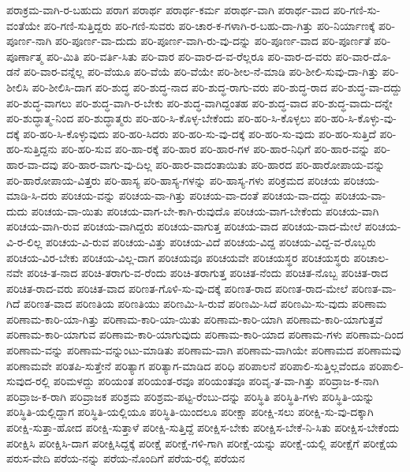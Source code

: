 {ಪರಾಕ್ರಮ-ವಾಗಿ-ರ-ಬಹುದು
ಪರಾಗ
ಪರಾರ್ಥ
ಪರಾರ್ಥ-ಕರ್ಮ
ಪರಾರ್ಥ-ವಾಗಿ
ಪರಾರ್ಥ-ವಾದ
ಪರಿ-ಗಣಿ-ಸು-ವಂತೆಯೇ
ಪರಿ-ಗಣಿ-ಸುತ್ತಿದ್ದರು
ಪರಿ-ಗಣಿ-ಸುವರು
ಪರಿ-ಚಾರ-ಕ-ಗಳಾಗಿ-ರ-ಬಹು-ದಾ-ಗಿತ್ತು
ಪರಿ-ನಿರ್ಯಾಣಕ್ಕೆ
ಪರಿ-ಪೂರ್ಣ-ನಾಗಿ
ಪರಿ-ಪೂರ್ಣ-ವಾ-ದುದು
ಪರಿ-ಪೂರ್ಣ-ವಾಗಿ-ರು-ವು-ದನ್ನು
ಪರಿ-ಪೂರ್ಣ-ವಾದ
ಪರಿ-ಪೂರ್ಣತೆ
ಪರಿ-ಪೂರ್ಣಾತ್ಮ
ಪರಿ-ಮಿತಿ
ಪರಿ-ವರ್ತಿ-ಸಿತು
ಪರಿ-ವಾರ
ಪರಿ-ವಾರ-ದ-ವ-ರೆಲ್ಲರೂ
ಪರಿ-ವಾರ-ದ-ವರು
ಪರಿ-ವಾರ-ದೊ-ಡನೆ
ಪರಿ-ವಾರ-ವನ್ನೆಲ್ಲ
ಪರಿ-ವೆಯೂ
ಪರಿ-ವೆಯೆ
ಪರಿ-ವೆಯೇ
ಪರಿ-ಶೀಲ-ನೆ-ಮಾಡಿ
ಪರಿ-ಶೀಲಿ-ಸುವು-ದಾ-ಗಿತ್ತು
ಪರಿ-ಶೀಲಿಸಿ
ಪರಿ-ಶೀಲಿಸಿ-ದಾಗ
ಪರಿ-ಶುದ್ಧ
ಪರಿ-ಶುದ್ಧ-ನಾದ
ಪರಿ-ಶುದ್ಧ-ರಾಗು-ವರು
ಪರಿ-ಶುದ್ಧ-ರಾದ
ಪರಿ-ಶುದ್ಧ-ವಾ-ದದ್ದು
ಪರಿ-ಶುದ್ಧ-ವಾಗಲು
ಪರಿ-ಶುದ್ಧ-ವಾಗಿ-ರ-ಬೇಕು
ಪರಿ-ಶುದ್ಧ-ವಾಗಿದ್ದಂತಹ
ಪರಿ-ಶುದ್ಧ-ವಾದ
ಪರಿ-ಶುದ್ಧ-ವಾದು-ದನ್ನೇ
ಪರಿ-ಶುದ್ಧಾತ್ಮ-ನಿಂದ
ಪರಿ-ಶುದ್ಧಾತ್ಮರು
ಪರಿ-ಹರಿ-ಸಿ-ಕೊಳ್ಳ-ಬೇಕೆಂದು
ಪರಿ-ಹರಿ-ಸಿ-ಕೊಳ್ಳಲು
ಪರಿ-ಹರಿ-ಸಿ-ಕೊಳ್ಳು-ವು-ದಕ್ಕೆ
ಪರಿ-ಹರಿ-ಸಿ-ಕೊಳ್ಳುವುದು
ಪರಿ-ಹರಿ-ಸಿದರು
ಪರಿ-ಹರಿ-ಸು-ವು-ದಕ್ಕೆ
ಪರಿ-ಹರಿ-ಸು-ವುದು
ಪರಿ-ಹರಿ-ಸುತ್ತಿದೆ
ಪರಿ-ಹರಿ-ಸುತ್ತಿದ್ದನು
ಪರಿ-ಹರಿ-ಸುವ
ಪರಿ-ಹಾ-ರಕ್ಕೆ
ಪರಿ-ಹಾರ
ಪರಿ-ಹಾರ-ಗಳ
ಪರಿ-ಹಾರ-ನಿಧಿಗೆ
ಪರಿ-ಹಾರ-ವನ್ನು
ಪರಿ-ಹಾರ-ವಾ-ದವು
ಪರಿ-ಹಾರ-ವಾಗು-ವು-ದಿಲ್ಲ
ಪರಿ-ಹಾರ-ವಾದಂತಾಯಿತು
ಪರಿ-ಹಾರದ
ಪರಿ-ಹಾರೋಪಾಯ-ವನ್ನು
ಪರಿ-ಹಾರೋಪಾಯ-ವಿತ್ತರು
ಪರಿ-ಹಾಸ್ಯ
ಪರಿ-ಹಾಸ್ಯ-ಗಳನ್ನು
ಪರಿ-ಹಾಸ್ಯ-ಗಳು
ಪರಿಕ್ರಮದ
ಪರಿಚಯ
ಪರಿಚಯ-ಮಾಡಿ-ಸಿ-ದರು
ಪರಿಚಯ-ವನ್ನು
ಪರಿಚಯ-ವಾ-ಗಿತ್ತು
ಪರಿಚಯ-ವಾ-ದಂತೆ
ಪರಿಚಯ-ವಾ-ದದ್ದು
ಪರಿಚಯ-ವಾ-ದುದು
ಪರಿಚಯ-ವಾ-ಯಿತು
ಪರಿಚಯ-ವಾಗ-ಬೇ-ಕಾಗಿ-ರುವುದೊ
ಪರಿಚಯ-ವಾಗ-ಬೇಕೆಂದು
ಪರಿಚಯ-ವಾಗಿ
ಪರಿಚಯ-ವಾಗಿ-ರುವ
ಪರಿಚಯ-ವಾಗಿದ್ದರು
ಪರಿಚಯ-ವಾಗುತ್ತ
ಪರಿಚಯ-ವಾದ
ಪರಿಚಯ-ವಾದ-ಮೇಲೆ
ಪರಿಚಯ-ವಿ-ರ-ಲಿಲ್ಲ
ಪರಿಚಯ-ವಿ-ರುವ
ಪರಿಚಯ-ವಿತ್ತು
ಪರಿಚಯ-ವಿದೆ
ಪರಿಚಯ-ವಿದ್ದ
ಪರಿಚಯ-ವಿದ್ದ-ವ-ರೊಬ್ಬರು
ಪರಿಚಯ-ವಿರ-ಬೇಕು
ಪರಿಚಯ-ವಿಲ್ಲ-ದಾಗ
ಪರಿಚಯವೂ
ಪರಿಚಯವೇ
ಪರಿಚಯಸ್ಥರ
ಪರಿಚಯಸ್ಥರು
ಪರಿಚಾಲ-ನವೇ
ಪರಿಚಿ-ತ-ನಾದ
ಪರಿಚಿ-ತರಾಗು-ವ-ರೆಂದು
ಪರಿಚಿ-ತರಾಗುತ್ತ
ಪರಿಚಿತ-ನೆಂದು
ಪರಿಚಿತ-ನೊಬ್ಬ
ಪರಿಚಿತ-ರಾದ
ಪರಿಚಿತ-ರಾದ-ವರು
ಪರಿಚಿತ-ವಾದ
ಪರಿಣತ-ಗೊಳಿ-ಸು-ವು-ದಕ್ಕೆ
ಪರಿಣತ-ರಾದ
ಪರಿಣತ-ರಾದ-ಮೇಲೆ
ಪರಿಣತ-ವಾ-ಗಿದೆ
ಪರಿಣತ-ವಾದ
ಪರಿಣತಿಯ
ಪರಿಣತಿಯು
ಪರಿಣಮಿ-ಸಿ-ರುವೆ
ಪರಿಣಮಿ-ಸಿದೆ
ಪರಿಣಮಿ-ಸು-ವುದು
ಪರಿಣಾಮ
ಪರಿಣಾಮ-ಕಾರಿ-ಯಾ-ಗಿತ್ತು
ಪರಿಣಾಮ-ಕಾರಿ-ಯಾ-ಯಿತು
ಪರಿಣಾಮ-ಕಾರಿ-ಯಾಗಿ
ಪರಿಣಾಮ-ಕಾರಿ-ಯಾಗುತ್ತವೆ
ಪರಿಣಾಮ-ಕಾರಿ-ಯಾಗುವ
ಪರಿಣಾಮ-ಕಾರಿ-ಯಾಗುವುದು
ಪರಿಣಾಮ-ಕಾರಿ-ಯಾದ
ಪರಿಣಾಮ-ಗಳು
ಪರಿಣಾಮ-ದಿಂದ
ಪರಿಣಾಮ-ವನ್ನು
ಪರಿಣಾಮ-ವನ್ನುಂಟು-ಮಾಡಿತು
ಪರಿಣಾಮ-ವಾಗಿ
ಪರಿಣಾಮ-ವಾಗಿಯೇ
ಪರಿಣಾಮದ
ಪರಿಣಾಮವು
ಪರಿಣಾಮವೇ
ಪರಿತಪಿ-ಸುತ್ತೇನೆ
ಪರಿತ್ಯಾಗ
ಪರಿತ್ಯಾಗ-ಮಾಡಿದ
ಪರಿಧಿ
ಪರಿಪಾಲನೆ
ಪರಿಪಾಲಿ-ಸುತ್ತಿಲ್ಲವೆಂದೂ
ಪರಿಪಾಲಿ-ಸುವುದ-ರಲ್ಲಿ
ಪರಿಮಳದ್ದು
ಪರಿಯಂತ
ಪರಿಯಂತ-ರವೂ
ಪರಿಯಂತವೂ
ಪರಿವೃ-ತ-ವಾ-ಗಿತ್ತು
ಪರಿವ್ರಾಜ-ಕ-ನಾಗಿ
ಪರಿವ್ರಾಜ-ಕ-ರಾಗಿ
ಪರಿವ್ರಾಜಕ
ಪರಿಶ್ರಮ
ಪರಿಶ್ರಮ-ಪಟ್ಟ-ರೆಂಬು-ದನ್ನು
ಪರಿಸ್ಥಿತಿ
ಪರಿಸ್ಥಿತಿ-ಗಳು
ಪರಿಸ್ಥಿತಿ-ಯನ್ನು
ಪರಿಸ್ಥಿತಿ-ಯಲ್ಲಿದ್ದಾಗ
ಪರಿಸ್ಥಿತಿ-ಯಲ್ಲಿಯೂ
ಪರಿಸ್ಥಿತಿ-ಯಿಂದಲೂ
ಪರೀಕ್ಷಾ
ಪರೀಕ್ಷಿ-ಸಲು
ಪರೀಕ್ಷಿ-ಸು-ವು-ದಕ್ಕಾಗಿ
ಪರೀಕ್ಷಿ-ಸುತ್ತಾ-ಹೋದ
ಪರೀಕ್ಷಿ-ಸುತ್ತಾಳೆ
ಪರೀಕ್ಷಿ-ಸುತ್ತಿದ್ದೆ
ಪರೀಕ್ಷಿಸ-ಬೇಕು
ಪರೀಕ್ಷಿಸ-ಬೇಕೆ-ನಿ-ಸಿತು
ಪರೀಕ್ಷಿಸ-ಬೇಕೆಂದು
ಪರೀಕ್ಷಿಸಿ
ಪರೀಕ್ಷಿಸಿ-ದಾಗ
ಪರೀಕ್ಷಿಸಿದ್ದಕ್ಕೆ
ಪರೀಕ್ಷೆ
ಪರೀಕ್ಷೆ-ಗಳಿ-ಗಾಗಿ
ಪರೀಕ್ಷೆ-ಯನ್ನು
ಪರೀಕ್ಷೆ-ಯಲ್ಲಿ
ಪರೀಕ್ಷೆಗೆ
ಪರೀಕ್ಷೆಯ
ಪರುಸ-ವೇದಿ
ಪರೆಯ-ನನ್ನು
ಪರೆಯ-ನೊಂದಿಗೆ
ಪರೆಯ-ರಲ್ಲಿ
ಪರೆಯನ
}
